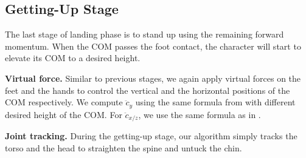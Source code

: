 \subsection{Getting-Up Stage}
The last stage of landing phase is to stand up using the remaining
forward momentum. When the COM passes the foot contact, the character
will start to elevate its COM to a desired height.

\textbf{Virtual force.} Similar to previous stages, we again apply
virtual forces on the feet and the hands to control the vertical and
the horizontal positions of the COM respectively. We compute $\ddot{c}_y$
using the same formula from  with different desired
height of the COM. For $\ddot{c}_{x/z}$, we use the same formula as
in .

\textbf{Joint tracking.} During the getting-up stage, our algorithm
simply tracks the torso and the head to straighten the spine and untuck the chin.

